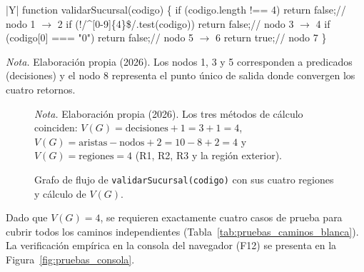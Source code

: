 \documentclass[12pt,a4paper]{article}
\begin{document}
\begin{table}[H]
  \centering
  \caption{Código fuente anotado por nodos de la función \protect\texttt{validarSucursal(codigo)}.}
  \label{tab:pruebas_codigo_blanca}
  \begin{tabularx}{\linewidth}{|Y|}
    \hline
    \ttfamily\footnotesize
    function validarSucursal(codigo) \{ \newline
    \hspace*{1.5em}if (codigo.length !== 4) return false;\hfill\textrm{\footnotesize // nodo 1 $\rightarrow$ 2} \newline
    \hspace*{1.5em}if (!/\^{}[0-9]\{4\}\$/.test(codigo)) return false;\hfill\textrm{\footnotesize // nodo 3 $\rightarrow$ 4} \newline
    \hspace*{1.5em}if (codigo[0] === "0") return false;\hfill\textrm{\footnotesize // nodo 5 $\rightarrow$ 6} \newline
    \hspace*{1.5em}return true;\hfill\textrm{\footnotesize // nodo 7} \newline
    \} \\ \hline
  \end{tabularx}
  \par\vspace{0.2cm}
  {\raggedright \small \emph{Nota.} Elaboración propia (2026). Los nodos 1, 3 y 5 corresponden a predicados (decisiones) y el nodo 8 representa el punto único de salida donde convergen los cuatro retornos.\par}
\end{table}

\begin{figure}[H]
  \caption{Grafo de flujo de \protect\texttt{validarSucursal(codigo)} con sus cuatro regiones y cálculo de $V(G)$.}
  \label{fig:pruebas_grafo_flujo}
  \centering
  \resizebox{0.92\linewidth}{!}{}
  \par\vspace{1ex}
  \raggedright\noindent\small \emph{Nota.} Elaboración propia (2026). Los tres métodos de cálculo coinciden: $V(G) = \text{decisiones} + 1 = 3 + 1 = 4$, $V(G) = \text{aristas} - \text{nodos} + 2 = 10 - 8 + 2 = 4$ y $V(G) = \text{regiones} = 4$ (R1, R2, R3 y la región exterior).
\end{figure}

Dado que $V(G) = 4$, se requieren exactamente cuatro casos de prueba para cubrir todos los caminos independientes (Tabla~\ref{tab:pruebas_caminos_blanca}). La verificación empírica en la consola del navegador (F12) se presenta en la Figura~\ref{fig:pruebas_consola}.
\end{document}
